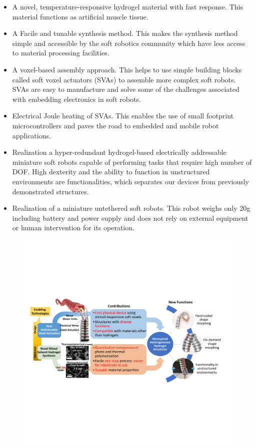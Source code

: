 \begin{itemize}
	\item A novel, temperature-responsive hydrogel material with fast response. This material functions as artificial muscle tissue. 
	\item A Facile and tunable synthesis method. This makes the synthesis method simple and accessible by the soft robotics community which have less access to material processing facilities.
	\item A voxel-based assembly approach. This helps to use simple building blocks called soft voxel actuators (SVAs) to assemble more complex soft robots. SVAs are easy to manufacture and solve some of the challenges associated with embedding electronics in soft robots.
	\item Electrical Joule heating of SVAs. This enables the use of small footprint microcontrollers and paves the road to embedded and mobile robot applications.
	\item Realization a hyper-redundant hydrogel-based electrically addressable miniature soft robots capable of performing tasks that require high number of DOF. High dexterity and the ability to function in unstructured environments are functionalities, which separates our devices from previously demonstrated structures.
	\item Realization of a miniature untethered soft robots. This robot weighs only 20g including battery and power supply and does not rely on external equipment or human intervention for its operation.
\end{itemize}
\begin{figure}[!ht]
      \centering
      \includegraphics[width=\textwidth]{summary.pdf}
      \caption[Summary of contributions of this dissertation]{}
      \label{fig:summary}
\end{figure}
